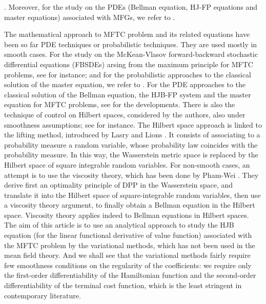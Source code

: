 \documentclass[11pt]{article}
\numberwithin{equation}{section}
\newcommand{\1}{\mbox{1\hspace{-1mm}I}}
\begin{document}
\cite{barbu2023uniqueness,ren2022linearization}. Moreover, for the study on the PDEs (Bellman equation, HJ-FP equations and master equations) associated with MFGs, we refer to \cite{AB_book,GW,GDA,GM}. 

The mathematical approach to MFTC problem and its related equations have been so far PDE techniques or probabilistic techniques. They are used mostly in smooth cases. For the study on the McKean-Vlasov forward-backward stochastic differential equations (FBSDEs) arsing from the maximum principle for MFTC problems, see \cite{AB10'',CR,book_mfg} for instance; and for the probabilistic approaches to the classical solution of the master equation, we refer to \cite{AB10,CJF}. For the PDE approaches to the classical solution of the Bellman equation, the HJB-FP system and the master equation for MFTC problems, see \cite{AB_book,AB_JMPA,CDLL} for the developments. There is also the technique of control on Hilbert spaces, considered by the authors, also under smoothness assumptions; see \cite{AB6,AB8,AB5} for instance. The Hilbert space approach is linked to the lifting method, introduced by Lasry and Lions \cite{JM3}. It consists of associating to a probability measure a random variable, whose probability law coincides with the probability measure. In this way, the Wasserstein metric space is replaced by the Hilbert space of square integrable random variables. For non-smooth cases, an attempt is to use the viscosity theory, which has been done by Pham-Wei \cite{PH}. They derive first an optimality principle of DPP in the Wasserstein space, and translate it into the Hilbert space of square-integrable random variables, then use a viscosity theory argument, to finally obtain a Bellman equation in the Hilbert space. Viscosity theory applies indeed to Bellman equations in Hilbert spaces. The aim of this article is to use an analytical approach to study the HJB equation (for the linear functional derivative of value function) associated with the MFTC problem by the variational methods, which has not been used in the mean field theory. And we shall see that the variational methods fairly require few smoothness conditions on the regularity of the coefficients: we require only the first-order differentiability of the Hamiltonian function and the second-order differentiability of the terminal cost function, which is the least stringent in contemporary literature.
\end{document}
